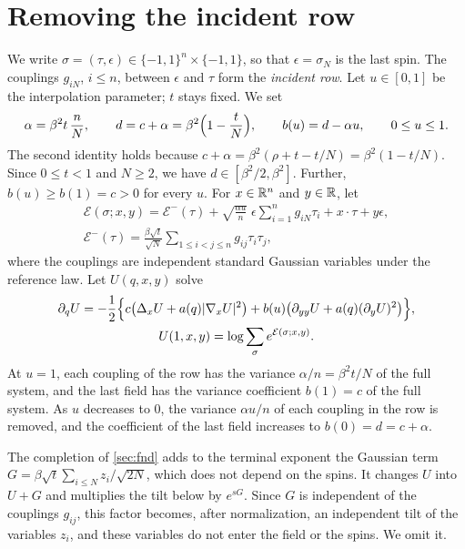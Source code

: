 \section{Removing the incident row}\label{subsec:c7-row}

We write $\sigma=(\tau,\epsilon)\in\{-1,1\}^n\times\{-1,1\}$, so that
$\epsilon=\sigma_N$ is the last spin. The couplings $g_{iN}$, $i\le n$,
between $\epsilon$ and $\tau$ form the \emph{incident row}. Let
$u\in[0,1]$ be the interpolation parameter; $t$ stays fixed. We set
\begin{equation}\label{eq:cavityparameters}
 \alpha=\beta^2t\,\frac nN,\qquad
 d=c+\alpha=\beta^2\Bigl(1-\frac tN\Bigr),\qquad
 b(u)=d-\alpha u,\qquad 0\le u\le1.
\end{equation}
The second identity holds because
$c+\alpha=\beta^2(\rho+t-t/N)=\beta^2(1-t/N)$. Since $0\le t<1$ and
$N\ge2$, we have $d\in[\beta^2/2,\beta^2]$. Further, $b(u)\ge b(1)=c>0$
for every $u$. For $x\in\mathbb R^n$ and $y\in\mathbb R$, let
\begin{gather*}
 \mathcal E(\sigma;x,y)=\mathcal E^-(\tau)
 +\sqrt{\frac{\alpha u}{n}}\;\epsilon\sum_{i=1}^ng_{iN}\tau_i
 +x\cdot\tau+y\epsilon,
 \\
 \mathcal E^-(\tau)=\frac{\beta\sqrt t}{\sqrt N}
       \sum_{1\le i<j\le n}g_{ij}\tau_i\tau_j,
\end{gather*}
where the couplings are independent standard Gaussian variables under the
reference law. Let $U(q,x,y)$ solve
\begin{equation}\label{eq:cavityPDE}
 \begin{gathered}
 \partial_q U=-\frac12\Bigl\{
 c\bigl(\Delta_xU+a(q)|\nabla_xU|^2\bigr)
 +b(u)\bigl(\partial_{yy}U+a(q)(\partial_yU)^2\bigr)\Bigr\},
 \\ U(1,x,y)=\log\sum_\sigma e^{\mathcal E(\sigma;x,y)}.
 \end{gathered}
\end{equation}
At $u=1$, each coupling of the row has the variance $\alpha/n=\beta^2t/N$
of the full system, and the last field has the variance coefficient
$b(1)=c$ of the full system. As $u$ decreases to $0$, the variance
$\alpha u/n$ of each coupling in the row is removed, and the coefficient
of the last field increases to $b(0)=d=c+\alpha$.

The completion of \cref{sec:fnd} adds to the terminal exponent the
Gaussian term $G=\beta\sqrt t\sum_{i\le N}z_i/\sqrt{2N}$, which does not
depend on the spins. It changes $U$ into $U+G$ and multiplies the tilt
below by $e^{sG}$. Since $G$ is independent of the couplings $g_{ij}$,
this factor becomes, after normalization, an independent tilt of the
variables $z_i$, and these variables do not enter the field or the
spins. We omit it.

